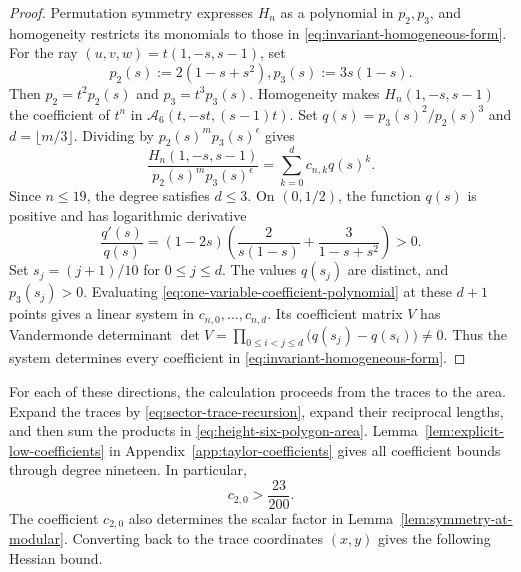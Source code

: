 \documentclass[10pt,twoside]{article}
\theoremstyle{plain}
\theoremstyle{definition}
\theoremstyle{remark}
\newcommand{\A}{\mathcal A}
\begin{document}
\begin{proof}
Permutation symmetry expresses $H_n$ as a polynomial in $p_2,p_3$,
and homogeneity restricts its monomials to those in
\eqref{eq:invariant-homogeneous-form}.
For the ray $(u,v,w)=t(1,-s,s-1)$, set
$$
p_2(s):=2(1-s+s^2),
p_3(s):=3s(1-s).
$$
Then $p_2=t^2p_2(s)$ and $p_3=t^3p_3(s)$.
Homogeneity makes $H_n(1,-s,s-1)$ the coefficient of $t^n$ in
$\A_6(t,-st,(s-1)t)$.
Set $q(s)=p_3(s)^2/p_2(s)^3$ and $d=\lfloor m/3\rfloor$.
Dividing by $p_2(s)^m p_3(s)^\epsilon$ gives
\begin{equation}
\label{eq:one-variable-coefficient-polynomial}
\frac{H_n(1,-s,s-1)}{p_2(s)^m p_3(s)^\epsilon}
=\sum_{k=0}^{d}c_{n,k}q(s)^k.
\end{equation}
Since $n\leq19$, the degree satisfies $d\leq3$.
On $(0,1/2)$, the function $q(s)$ is positive and has logarithmic
derivative
$$
\frac{q'(s)}{q(s)}
=(1-2s)\left(\frac2{s(1-s)}+
\frac3{1-s+s^2}\right)>0.
$$
Set $s_j=(j+1)/10$ for $0\leq j\leq d$.
The values $q(s_j)$ are distinct, and $p_3(s_j)>0$.
Evaluating
\eqref{eq:one-variable-coefficient-polynomial} at these $d+1$ points
gives a linear system in $c_{n,0},\ldots,c_{n,d}$.
Its coefficient matrix $V$ has Vandermonde determinant
$
\det V=\prod_{0\leq i<j\leq d}
\bigl(q(s_j)-q(s_i)\bigr)\ne0.
$
Thus the system determines every coefficient in
\eqref{eq:invariant-homogeneous-form}.
\end{proof}

For each of these directions, the calculation proceeds from the
traces to the area. Expand the traces by
\eqref{eq:sector-trace-recursion}, expand their reciprocal lengths,
and then sum the products in \eqref{eq:height-six-polygon-area}.
Lemma~\ref{lem:explicit-low-coefficients} in
Appendix~\ref{app:taylor-coefficients} gives all coefficient bounds
through degree nineteen. In particular,
\begin{equation}
\label{eq:quadratic-area-coefficient}
c_{2,0}>\frac{23}{200}.
\end{equation}
The coefficient $c_{2,0}$ also determines the scalar factor in
Lemma~\ref{lem:symmetry-at-modular}. Converting back to the trace
coordinates $(x,y)$ gives the following Hessian bound.
\end{document}
